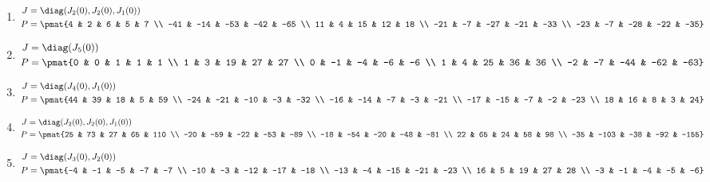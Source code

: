 \begin{enumerate}
\item

\begin{align*}
J &= \diag(J_{2}(0), J_{2}(0), J_{1}(0))\\
P &= \pmat{4 & 2 & 6 & 5 & 7 \\ -41 & -14 & -53 & -42 & -65 \\ 11 & 4 & 15 & 12 & 18 \\ -21 & -7 & -27 & -21 & -33 \\ -23 & -7 & -28 & -22 & -35}
\end{align*}

\item

\begin{align*}
J &= \diag(J_{5}(0))\\
P &= \pmat{0 & 0 & 1 & 1 & 1 \\ 1 & 3 & 19 & 27 & 27 \\ 0 & -1 & -4 & -6 & -6 \\ 1 & 4 & 25 & 36 & 36 \\ -2 & -7 & -44 & -62 & -63}
\end{align*}

\item

\begin{align*}
J &= \diag(J_{4}(0), J_{1}(0))\\
P &= \pmat{44 & 39 & 18 & 5 & 59 \\ -24 & -21 & -10 & -3 & -32 \\ -16 & -14 & -7 & -3 & -21 \\ -17 & -15 & -7 & -2 & -23 \\ 18 & 16 & 8 & 3 & 24}
\end{align*}

\item

\begin{align*}
J &= \diag(J_{2}(0), J_{2}(0), J_{1}(0))\\
P &= \pmat{25 & 73 & 27 & 65 & 110 \\ -20 & -59 & -22 & -53 & -89 \\ -18 & -54 & -20 & -48 & -81 \\ 22 & 65 & 24 & 58 & 98 \\ -35 & -103 & -38 & -92 & -155}
\end{align*}

\item

\begin{align*}
J &= \diag(J_{3}(0), J_{2}(0))\\
P &= \pmat{-4 & -1 & -5 & -7 & -7 \\ -10 & -3 & -12 & -17 & -18 \\ -13 & -4 & -15 & -21 & -23 \\ 16 & 5 & 19 & 27 & 28 \\ -3 & -1 & -4 & -5 & -6}
\end{align*}


\end{enumerate}
